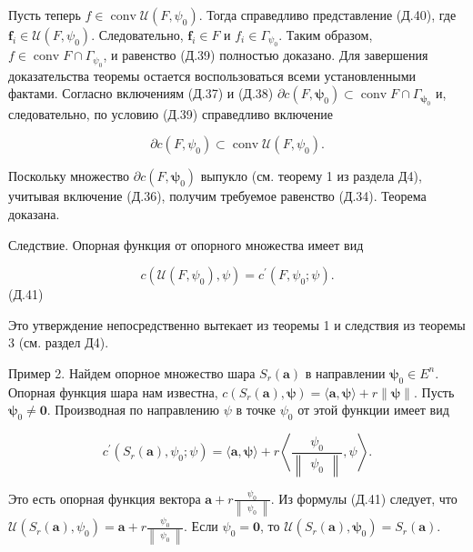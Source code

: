 \documentclass[8pt]{extarticle}
\begin{document}
Пусть теперь \(f \in  \operatorname{conv}\mathcal{U}\left( {F,{\psi }_{0}}\right)\). Тогда справедливо представление (Д.40), где \({\mathbf{f}}_{i} \in  \mathcal{U}\left( {F,{\psi }_{0}}\right)\). Следовательно, \({\mathbf{f}}_{i} \in  F\) и \({f}_{i} \in  {\Gamma }_{{\psi }_{0}}\). Таким образом, \(f \in  \operatorname{conv}F \cap  {\Gamma }_{{\psi }_{0}}\), и равенство (Д.39) полностью доказано. Для завершения доказательства теоремы остается воспользоваться всеми установленными фактами. Согласно включениям (Д.37) и (Д.38) \(\partial c\left( {F,{\mathbf{\psi }}_{0}}\right)  \subset  \operatorname{conv}F \cap  {\Gamma }_{{\mathbf{\psi }}_{0}}\) и, следовательно, по условию (Д.39) справедливо включение

\[
\partial c\left( {F,{\psi }_{0}}\right)  \subset  \operatorname{conv}\mathcal{U}\left( {F,{\psi }_{0}}\right) .
\]

Поскольку множество \(\partial c\left( {F,{\mathbf{\psi }}_{0}}\right)\) выпукло (см. теорему 1 из раздела Д4), учитывая включение (Д.36), получим требуемое равенство (Д.34). Теорема доказана.

Следствие. Опорная функция от опорного множества имеет вид

\[
c\left( {\mathcal{U}\left( {F,{\psi }_{0}}\right) ,\psi }\right)  = {c}^{\prime }\left( {F,{\psi }_{0};\psi }\right) .
\]
 (Д.41)

Это утверждение непосредственно вытекает из теоремы 1 и следствия из теоремы 3 (см. раздел Д4).

Пример 2. Найдем опорное множество шара \({S}_{r}\left( \mathbf{a}\right)\) в направлении \({\mathbf{\psi }}_{0} \in  {E}^{n}\). Опорная функция шара нам известна, \(c\left( {{S}_{r}\left( \mathbf{a}\right) ,\mathbf{\psi }}\right)  = \langle \mathbf{a},\mathbf{\psi }\rangle  + r\parallel \mathbf{\psi }\parallel\). Пусть \({\mathbf{\psi }}_{0} \neq  \mathbf{0}\). Производная по направлению \(\psi\) в точке \({\psi }_{0}\) от этой функции имеет вид

\[
{c}^{\prime }\left( {{S}_{r}\left( \mathbf{a}\right) ,{\psi }_{0};\psi }\right)  = \langle \mathbf{a},\mathbf{\psi }\rangle  + r\left\langle  {\frac{{\psi }_{0}}{\left\lVert \begin{array}{c} {\psi }_{0} \end{array} \right\rVert},\psi }\right\rangle  .
\]

Это есть опорная функция вектора \(\mathbf{a} + r \frac{{\psi }_{0}}{\left\lVert \begin{array}{c} {\psi }_{0} \end{array} \right\rVert}\). Из формулы (Д.41) следует, что \(\mathcal{U}\left( {{S}_{r}\left( \mathbf{a}\right) ,{\psi }_{0}}\right)  = \mathbf{a} + r\frac{{\psi }_{0}}{\left\lVert \begin{array}{c} {\psi }_{0} \end{array} \right\rVert}\). Если \({\psi }_{0} = \mathbf{0}\), то \(\mathcal{U}\left( {{S}_{r}\left( \mathbf{a}\right) ,{\mathbf{\psi }}_{0}}\right)  = {S}_{r}\left( \mathbf{a}\right)\).
\end{document}
